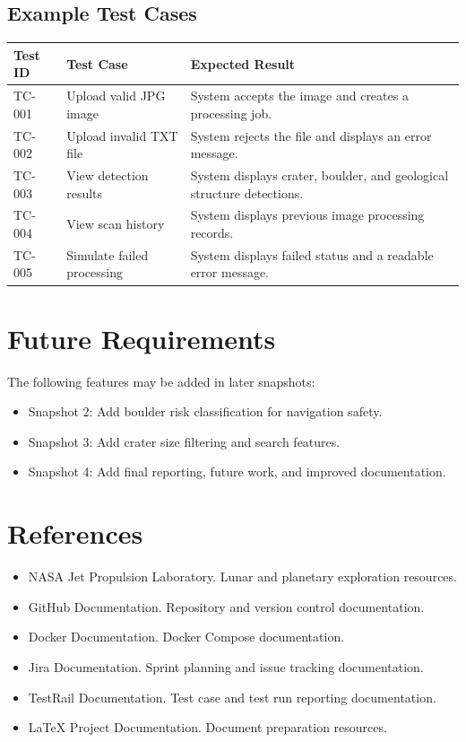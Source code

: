 \documentclass[12pt]{article}
\begin{document}
\subsection{Example Test Cases}

\begin{longtable}{|p{1in}|p{2in}|p{3in}|}
\hline
\textbf{Test ID} & \textbf{Test Case} & \textbf{Expected Result} \\
\hline
TC-001 & Upload valid JPG image & System accepts the image and creates a processing job. \\
\hline
TC-002 & Upload invalid TXT file & System rejects the file and displays an error message. \\
\hline
TC-003 & View detection results & System displays crater, boulder, and geological structure detections. \\
\hline
TC-004 & View scan history & System displays previous image processing records. \\
\hline
TC-005 & Simulate failed processing & System displays failed status and a readable error message. \\
\hline
\end{longtable}

\section{Future Requirements}

The following features may be added in later snapshots:

\begin{itemize}
    \item Snapshot 2: Add boulder risk classification for navigation safety.
    \item Snapshot 3: Add crater size filtering and search features.
    \item Snapshot 4: Add final reporting, future work, and improved documentation.
\end{itemize}

\section{References}

\begin{itemize}
    \item NASA Jet Propulsion Laboratory. Lunar and planetary exploration resources.
    \item GitHub Documentation. Repository and version control documentation.
    \item Docker Documentation. Docker Compose documentation.
    \item Jira Documentation. Sprint planning and issue tracking documentation.
    \item TestRail Documentation. Test case and test run reporting documentation.
    \item LaTeX Project Documentation. Document preparation resources.
\end{itemize}
\end{document}
